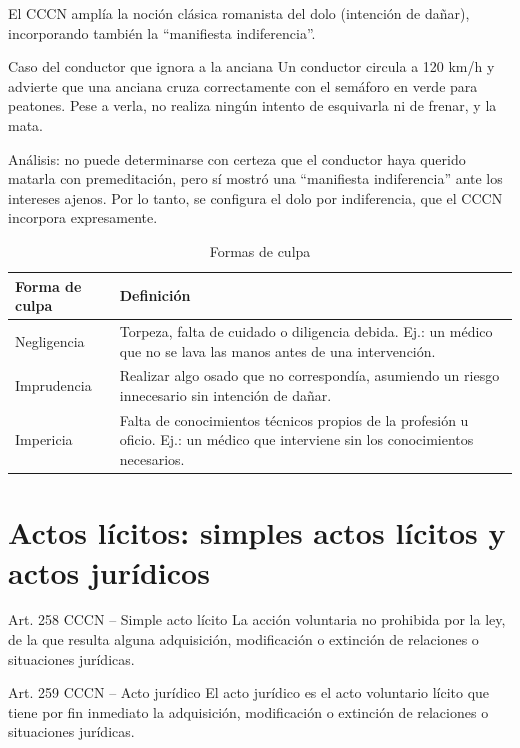 \documentclass[12pt,oneside]{book}
\begin{document}
El CCCN amplía la noción clásica romanista del dolo (intención de dañar), incorporando también la ``manifiesta indiferencia''.

\begin{example}{Caso del conductor que ignora a la anciana}
Un conductor circula a 120 km/h y advierte que una anciana cruza correctamente con el semáforo en verde para peatones. Pese a verla, no realiza ningún intento de esquivarla ni de frenar, y la mata.

Análisis: no puede determinarse con certeza que el conductor haya querido matarla con premeditación, pero sí mostró una ``manifiesta indiferencia'' ante los intereses ajenos. Por lo tanto, se configura el dolo por indiferencia, que el CCCN incorpora expresamente.
\end{example}

\begin{table}[H]
\centering
\caption{Formas de culpa}
\begin{tabularx}{\textwidth}{l X}
\toprule
\textbf{Forma de culpa} & \textbf{Definición} \\
\midrule
Negligencia & Torpeza, falta de cuidado o diligencia debida. Ej.: un médico que no se lava las manos antes de una intervención. \\
Imprudencia & Realizar algo osado que no correspondía, asumiendo un riesgo innecesario sin intención de dañar. \\
Impericia & Falta de conocimientos técnicos propios de la profesión u oficio. Ej.: un médico que interviene sin los conocimientos necesarios. \\
\bottomrule
\end{tabularx}
\end{table}

\section{Actos lícitos: simples actos lícitos y actos jurídicos}

\begin{definition}{Art. 258 CCCN -- Simple acto lícito}
La acción voluntaria no prohibida por la ley, de la que resulta alguna adquisición, modificación o extinción de relaciones o situaciones jurídicas.
\end{definition}

\begin{definition}{Art. 259 CCCN -- Acto jurídico}
El acto jurídico es el acto voluntario lícito que tiene por fin inmediato la adquisición, modificación o extinción de relaciones o situaciones jurídicas.
\end{definition}
\end{document}
